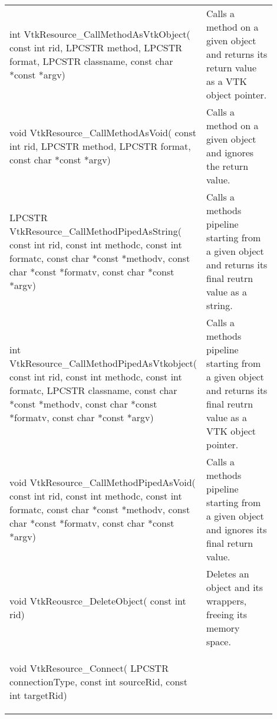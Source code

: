 \begin{appendices}
\begin{landscape}
\begin{longtable}[c]{
			>{\raggedright\arraybackslash}p{0.4\linewidth}
			>{\raggedright\arraybackslash}p{0.5\linewidth}
		}
	\\
	\begin{codify}
	int VtkResource_CallMethodAsVtkObject(
		const int rid,
		LPCSTR method,
		LPCSTR format,
		LPCSTR classname,
		const char *const *argv)
	\end{codify} &
	Calls a method on a given object and returns its return value as a VTK object pointer.
	\\
	\begin{codify}
	void VtkResource_CallMethodAsVoid(
		const int rid,
		LPCSTR method,
		LPCSTR format,
		const char *const *argv)
	\end{codify} &
	Calls a method on a given object and ignores the return value.
	\\
	\begin{codify}
	LPCSTR VtkResource_CallMethodPipedAsString(
		const int rid,
		const int methodc,
		const int formatc,
		const char *const *methodv,
		const char *const *formatv,
		const char *const *argv)
	\end{codify} &
	Calls a methods pipeline starting from a given object and returns its final reutrn value as a string.
	\\
	\begin{codify}
	int VtkResource_CallMethodPipedAsVtkobject(
		const int rid,
		const int methodc,
		const int formatc,
		LPCSTR classname,
		const char *const *methodv,
		const char *const *formatv,
		const char *const *argv)
	\end{codify} &
	Calls a methods pipeline starting from a given object and returns its final reutrn value as a VTK object pointer.
	\\
	\begin{codify}
	void VtkResource_CallMethodPipedAsVoid(
		const int rid,
		const int methodc,
		const int formatc,
		const char *const *methodv,
		const char *const *formatv,
		const char *const *argv)
	\end{codify} &
	Calls a methods pipeline starting from a given object and ignores its final return value.
	\\
	\begin{codify}
	void VtkReousrce_DeleteObject(
		const int rid)
	\end{codify} &
	Deletes an object and its wrappers, freeing its memory space.
	\\
	\begin{codify}
	void VtkResource_Connect(
		LPCSTR connectionType,
		const int sourceRid,
		const int targetRid)
	\end{codify} &

\end{longtable}
\end{landscape}
\end{appendices}
